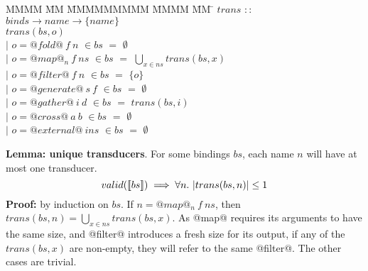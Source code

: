 \begin{tabbing}
MMMM \= MM \= MMMMMMMMM \= MMMM \= MM \= \kill
$trans$  \>$::$\> $binds \rightarrow name \rightarrow \{name\}$ \\
$trans(bs,o)$    \\
            \> $|$ \> $o = @fold@~f~n$      \> $\in bs$ \> $=$ \> $\emptyset$ \\
            \> $|$ \> $o = @map@_n~f~ns$    \> $\in bs$ \> $=$ \> $\bigcup_{x \in ns} trans(bs, x)$ \\
            \> $|$ \> $o = @filter@~f~n$    \> $\in bs$ \> $=$ \> $\{o\}$       \\
            \> $|$ \> $o = @generate@~s~f$  \> $\in bs$ \> $=$ \> $\emptyset$ \\
            \> $|$ \> $o = @gather@~i~d$    \> $\in bs$ \> $=$ \> $trans(bs,i)$ \\
            \> $|$ \> $o = @cross@~a~b$     \> $\in bs$ \> $=$ \> $\emptyset$ \\
            \> $|$ \> $o = @external@~ins$  \> $\in bs$ \> $=$ \> $\emptyset$ \\
\end{tabbing}

\textbf{Lemma: unique transducers}.
For some bindings $bs$, each name $n$ will have at most one transducer.
\[
valid(\constr{bs}) \implies \forall n.\ |trans(bs, n)| \le 1
\]
\textbf{Proof:} by induction on $bs$. If $n = @map@_n~f~ns$,
then $trans(bs,n) = \bigcup_{x \in ns} trans(bs,x)$.
As @map@ requires its arguments to have the same size, and @filter@ introduces a fresh size for its output,
if any of the $trans(bs,x)$ are non-empty, they will refer to the same @filter@.
The other cases are trivial.

